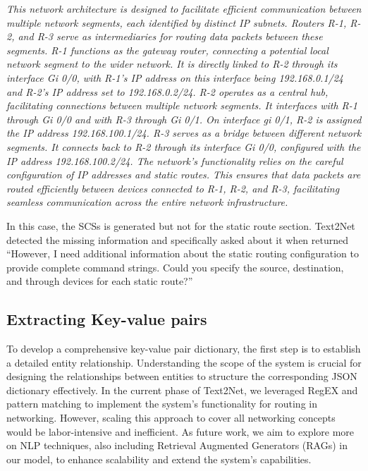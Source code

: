 
\textit{This network architecture is designed to facilitate efficient communication between multiple network segments, each identified by distinct IP subnets.
Routers R-1, R-2, and R-3 serve as intermediaries for routing data packets between these segments.
R-1 functions as the gateway router, connecting a potential local network segment to the wider network. It is directly linked to R-2 through its interface Gi 0/0, with R-1's IP address on this interface being 192.168.0.1/24 and R-2's IP address set to 192.168.0.2/24.
R-2 operates as a central hub, facilitating connections between multiple network segments. It interfaces with R-1 through Gi 0/0 and with R-3 through Gi 0/1. On interface gi 0/1, R-2 is assigned the IP address 192.168.100.1/24.
R-3 serves as a bridge between different network segments. It connects back to R-2 through its interface Gi 0/0, configured with the IP address 192.168.100.2/24.
The network's functionality relies on the careful configuration of IP addresses and static routes. This ensures that data packets are routed efficiently between devices connected to R-1, R-2, and R-3, facilitating seamless communication across the entire network infrastructure.}

In this case, the SCSs is generated but not for the static route section. Text2Net detected the missing information and specifically asked about it when returned ``However, I need additional information about the static routing configuration to provide complete command strings. Could you specify the source, destination, and through devices for each static route?''


\vspace{-2mm}
\subsection{Extracting Key-value pairs}

\iffalse
\begin{figure}[ht!]
    \centering
    \texttt{[image: Figures/venn\_diagram.svg]}
    \caption{Entities relationship}
    \vspace{-6mm}
    \label{fig: entity-relationship}
\end{figure}
\fi

To develop a comprehensive key-value pair dictionary, the first step is to establish a detailed entity relationship. Understanding the scope of the system is crucial for designing the relationships between entities to structure the corresponding JSON dictionary effectively. In the current phase of Text2Net, we leveraged RegEX and pattern matching to implement the system's functionality for routing in networking. However, scaling this approach to cover all networking concepts would be labor-intensive and inefficient. As future work, we aim to explore more on NLP techniques, also including Retrieval Augmented Generators (RAGs) in our model, to enhance scalability and extend the system's capabilities.

